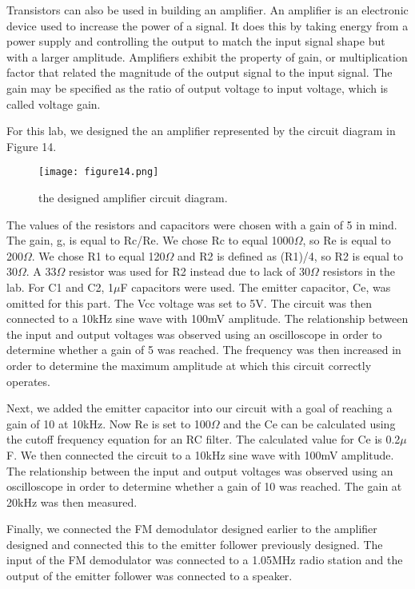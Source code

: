 \documentclass[12pt]{article}
\begin{document}
Transistors can also be used in building an amplifier. An amplifier is
an electronic device used to increase the power of a signal.  It does
this by taking energy from a power supply and controlling the output to
match the input signal shape but with a larger amplitude. Amplifiers
exhibit the property of gain, or multiplication factor that related the
magnitude of the output signal to the input signal. The gain may be
specified as the ratio of output voltage to input voltage, which is
called voltage gain.

For this lab, we designed the an amplifier represented by the circuit
diagram in Figure 14.

\begin {figure}[!h]
\centering
\texttt{[image: figure14.png]}
\caption{\label{rvd} the designed amplifier circuit diagram.}
\end {figure}

The values of the resistors and capacitors were chosen with a gain of 5
in mind. The gain, g, is equal to Rc/Re. We chose Rc to equal 1000$\Omega$, so
Re is equal to 200$\Omega$. We chose R1 to equal 120$\Omega$ and R2 is defined as
(R1)/4, so R2 is equal to 30$\Omega$. A 33$\Omega$ resistor was used for R2 instead
due to lack of 30$\Omega$ resistors in the lab. For C1 and C2, 1$\mu$F capacitors
were used. The emitter capacitor, Ce, was omitted for this part. The Vcc
voltage was set to 5V. The circuit was then connected to a 10kHz sine
wave with 100mV amplitude. The relationship between the input and output
voltages was observed using an oscilloscope in order to determine
whether a gain of 5 was reached. The frequency was then increased in
order to determine the maximum amplitude at which this circuit correctly
operates.
 

Next, we added the emitter capacitor into our circuit with a goal of
reaching a gain of 10 at 10kHz. Now Re is set to 100$\Omega$ and the Ce can be
calculated using the cutoff frequency equation for an RC filter. The
calculated value for Ce is 0.2$\mu$F. We then connected the circuit to a
10kHz sine wave with 100mV amplitude. The relationship between the input
and output voltages was observed using an oscilloscope in order to
determine whether a gain of 10 was reached. The gain at 20kHz was then
measured.
 

Finally, we connected the FM demodulator designed earlier to the
amplifier designed and connected this to the emitter follower previously
designed. The input of the FM demodulator was connected to a 1.05MHz
radio station and the output of the emitter follower was connected to a
speaker.
\end{document}
